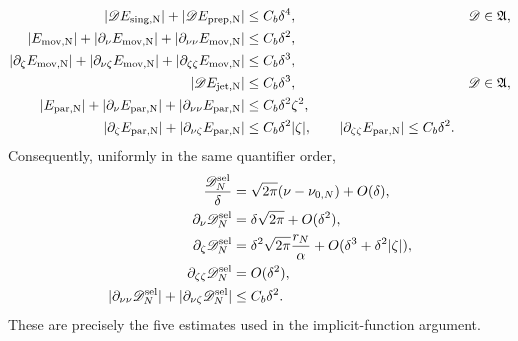 \begin{proposition}
\begin{align}
 |\mathscr D E_{\rm sing,N}|+|\mathscr D E_{\rm prep,N}|
   &\le C_b\delta^4,
       &&\mathscr D\in\mathfrak A,                    \label{eq:gap-error-tail-bound}\\
 |E_{\rm mov,N}|+|\partial_\nu E_{\rm mov,N}|
       +|\partial_{\nu\nu}E_{\rm mov,N}|
   &\le C_b\delta^2,                                  \label{eq:gap-error-moving-nu}\\
 |\partial_\zeta E_{\rm mov,N}|
       +|\partial_{\nu\zeta}E_{\rm mov,N}|
       +|\partial_{\zeta\zeta}E_{\rm mov,N}|
   &\le C_b\delta^3,                                  \label{eq:gap-error-moving-zeta}\\
 |\mathscr D E_{\rm jet,N}|&\le C_b\delta^3,
       &&\mathscr D\in\mathfrak A,                    \label{eq:gap-error-jet-bound}\\
 |E_{\rm par,N}|+|\partial_\nu E_{\rm par,N}|
       +|\partial_{\nu\nu}E_{\rm par,N}|
   &\le C_b\delta^2\zeta^2,                          \label{eq:gap-error-parameter-zero}\\
 |\partial_\zeta E_{\rm par,N}|
       +|\partial_{\nu\zeta}E_{\rm par,N}|
   &\le C_b\delta^2|\zeta|,
 \qquad
 |\partial_{\zeta\zeta}E_{\rm par,N}|
   \le C_b\delta^2.                                  \label{eq:gap-error-parameter-derivatives}
\end{align}
Consequently, uniformly in the same quantifier order,
\begin{align}
 \frac{\mathscr D_N^{\rm sel}}{\delta}
 &=\sqrt{2\pi}(\nu-\nu_{0,N})+O(\delta),             \label{eq:gap-bridge-expansion}\\
 \partial_\nu\mathscr D_N^{\rm sel}
 &=\delta\sqrt{2\pi}+O(\delta^2),                    \label{eq:gap-bridge-nu}\\
 \partial_\zeta\mathscr D_N^{\rm sel}
 &=\delta^2\sqrt{2\pi}\frac{r_N}{\alpha}
       +O(\delta^3+\delta^2|\zeta|),                 \label{eq:gap-bridge-zeta}\\
 \partial_{\zeta\zeta}\mathscr D_N^{\rm sel}
 &=O(\delta^2),                                       \label{eq:gap-bridge-zz}\\
 |\partial_{\nu\nu}\mathscr D_N^{\rm sel}|
       +|\partial_{\nu\zeta}\mathscr D_N^{\rm sel}|
 &\le C_b\delta^2.                                   \label{eq:gap-bridge-mixed}
\end{align}
These are precisely the five estimates used in the implicit-function
argument.
\end{proposition}

